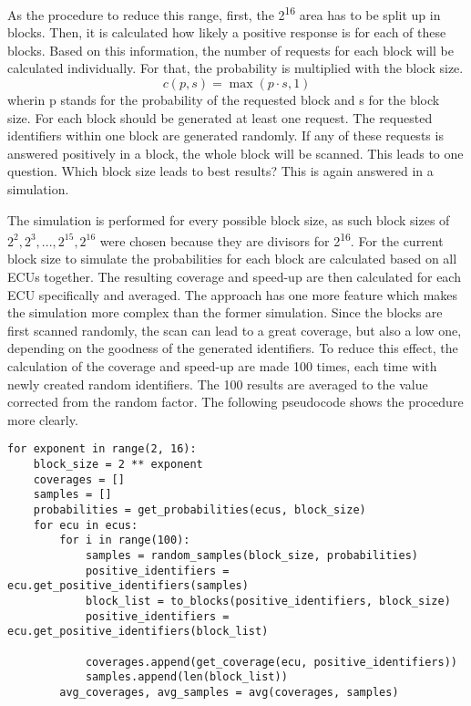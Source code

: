 As the procedure to reduce this range, first, the 2\textsuperscript{16} area has to be split up in blocks. Then, it is calculated how likely a positive response is for each of these blocks. Based on this information, the number of requests for each block will be calculated individually. For that, the probability is multiplied with the block size.
\[c(p, s)=\max(p \cdot s, 1)\]
wherin p stands for the probability of the requested block and s for the block size. For each block should be generated at least one request. The requested identifiers within one block are generated randomly. If any of these requests is answered positively in a block, the whole block will be scanned.
This leads to one question. Which block size leads to best results? This is again answered in a simulation.

The simulation is performed for every possible block size, as such block sizes of $2^2, 2^3, ..., 2^{15}, 2^{16}$ were chosen because they are divisors for 2\textsuperscript{16}. For the current block size to simulate the probabilities for each block are calculated based on all ECUs together. The resulting coverage and speed-up are then calculated for each ECU specifically and averaged. The approach has one more feature which makes the simulation more complex than the former simulation. Since the blocks are first scanned randomly, the scan can lead to a great coverage, but also a low one, depending on the goodness of the generated identifiers. To reduce this effect, the calculation of the coverage and speed-up are made 100 times, each time with newly created random identifiers. The 100 results are averaged to the value corrected from the random factor.
The following pseudocode shows the procedure more clearly.

\begin{samepage}
\begin{verbatim}
for exponent in range(2, 16):
    block_size = 2 ** exponent
    coverages = []
    samples = []
    probabilities = get_probabilities(ecus, block_size)
    for ecu in ecus:
        for i in range(100):
            samples = random_samples(block_size, probabilities)
            positive_identifiers = ecu.get_positive_identifiers(samples)
            block_list = to_blocks(positive_identifiers, block_size)
            positive_identifiers = ecu.get_positive_identifiers(block_list)

            coverages.append(get_coverage(ecu, positive_identifiers))
            samples.append(len(block_list))
        avg_coverages, avg_samples = avg(coverages, samples)
\end{verbatim}
\end{samepage}

